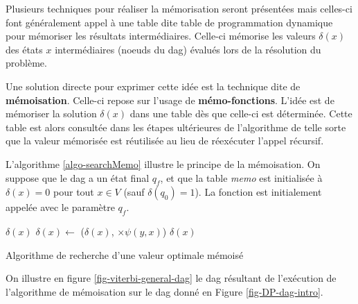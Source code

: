 \documentclass[11pt,openany]{book}
\newcommand{\ac}[1]{{\sc #1}} %
\newcommand{\kw}[1]{{\bf #1}} %
\begin{document}
Plusieurs techniques pour réaliser la mémorisation seront présentées
mais celles-ci font généralement appel à une table dite table de
programmation dynamique pour mémoriser les résultats
intermédiaires. Celle-ci mémorise les valeurs $\delta(x)$ des états
$x$ intermédiaires (noeuds du \ac{dag}) évalués lors de la résolution du problème.

Une solution directe pour exprimer cette idée est la technique dite de \kw{mémoisation}. Celle-ci repose sur l'usage de \kw{mémo-fonctions}. L'idée est de mémoriser la solution $\delta(x)$ dans une table dès que celle-ci est déterminée. Cette table est alors consultée dans les étapes ultérieures de l'algorithme de telle sorte que la valeur mémorisée est réutilisée au lieu de réexécuter l'appel récursif.

L'algorithme \ref{algo-searchMemo} illustre le principe de la mémoisation. On suppose que le \ac{dag} a un état final $q_f$, et que la table {\sl memo} est initialisée à $\delta(x) = 0$ pour tout  $x\in V$ (sauf $\delta(q_0) = 1$). La fonction est initialement appelée avec le paramètre $q_f$.  

\begin{algorithm}[htbp]
\begin{algorithmic}[1]
\State\Return $\delta(x)$
\EndIf
{}
\State $\delta(x)\gets$ ($\delta(x)$, $\times \psi(y,x)$)
\EndFor
\State\Return $\delta(x)$
\EndFunction
\end{algorithmic}
\caption{\label{algo-searchMemo}Algorithme de recherche d'une valeur optimale mémoisé}
\end{algorithm}

On illustre en figure \ref{fig-viterbi-general-dag} le \ac{dag}
résultant de l'exécution de l'algorithme de mémoisation sur
le \ac{dag} donné en Figure \ref{fig-DP-dag-intro}. 
\end{document}
